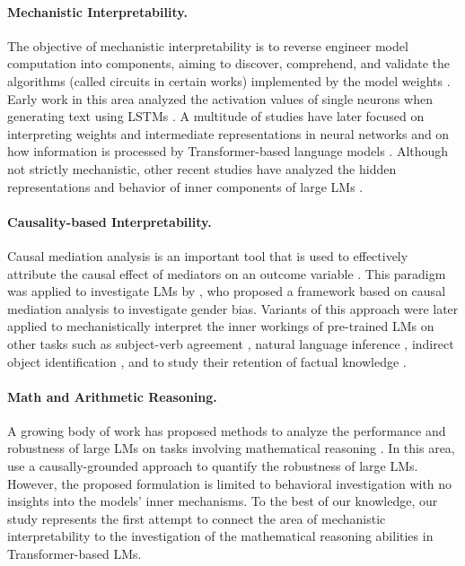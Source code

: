 \documentclass[11pt]{article}
\begin{document}
\paragraph{Mechanistic Interpretability.}
The objective of mechanistic interpretability is to reverse engineer model computation into components, aiming to discover, comprehend, and validate the algorithms (called circuits in certain works) implemented by the model weights \cite{rauker2023transparent}.
Early work in this area analyzed the activation values of single neurons when generating text using LSTMs \cite{karpathy2015visualizing}.
A multitude of studies have later focused on interpreting weights and  intermediate representations in neural networks \cite{olah2017feature, olah2018building,olah2020zoom,voss2021visualizing,goh2021multimodal} and on how information is processed by Transformer-based \cite{vaswani2017attention} language models \cite{geva-etal-2021-transformer,geva-etal-2022-transformer, geva2023dissecting, olsson2022context, nanda2023progress}.
Although not strictly mechanistic, other recent studies have analyzed the hidden representations and behavior of inner components of large LMs \cite{belrose2023eliciting,gurnee2023finding,bills2023language}.


\paragraph{Causality-based Interpretability.}
Causal mediation analysis is an important tool that is used to effectively attribute the causal effect of mediators on an outcome variable \cite{pearl2001direct}.
This paradigm was applied to investigate LMs by \citet{vig2020investigating}, who proposed a framework based on causal mediation analysis to investigate gender bias.
Variants of this approach were later applied to mechanistically interpret the inner workings of pre-trained LMs on other tasks such as subject-verb agreement \cite{finlayson-etal-2021-causal}, natural language inference \cite{geiger2021causal}, indirect object identification \cite{wang2022interpretability}, and to study their retention of factual knowledge \cite{meng2022locating}. 

\paragraph{Math and Arithmetic Reasoning.}
A growing body of work has proposed methods to analyze the performance and robustness of large LMs on tasks involving mathematical reasoning \cite{pal-baral-2021-investigating-numeracy, piekos-etal-2021-measuring, razeghi-etal-2022-impact, cobbe2021training, mishra-etal-2022-numglue}. In this area, \citet{stolfo-etal-2023-causal} use a causally-grounded approach to quantify the robustness of large LMs. However, the proposed formulation is limited to behavioral investigation with no insights into the models' inner mechanisms.
To the best of our knowledge, our study represents the first attempt to connect the area of mechanistic interpretability to the investigation of the mathematical reasoning abilities in Transformer-based LMs. 
\end{document}

